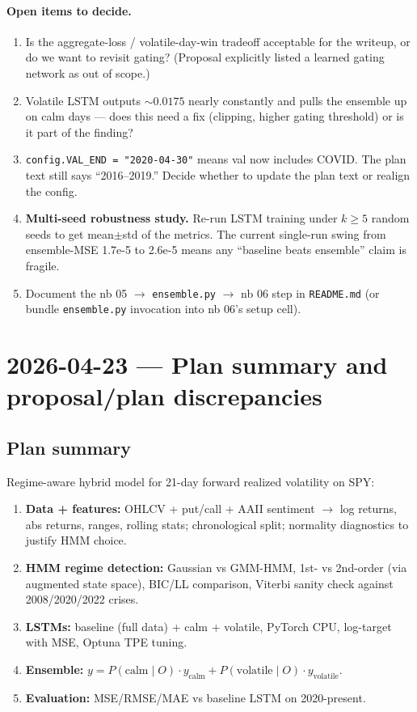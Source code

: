 \documentclass[11pt]{article}
\begin{document}
\paragraph{Open items to decide.}
\begin{enumerate}[leftmargin=*]
  \item Is the aggregate-loss / volatile-day-win tradeoff acceptable for the writeup, or do we want to revisit gating? (Proposal explicitly listed a learned gating network as out of scope.)
  \item Volatile LSTM outputs ${\sim}0.0175$ nearly constantly and pulls the ensemble up on calm days --- does this need a fix (clipping, higher gating threshold) or is it part of the finding?
  \item \texttt{config.VAL\_END = "2020-04-30"} means val now includes COVID. The plan text still says ``2016--2019.'' Decide whether to update the plan text or realign the config.
  \item \textbf{Multi-seed robustness study.} Re-run LSTM training under $k \geq 5$ random seeds to get mean$\pm$std of the metrics. The current single-run swing from ensemble-MSE 1.7e-5 to 2.6e-5 means any ``baseline beats ensemble'' claim is fragile.
  \item Document the nb 05 $\to$ \texttt{ensemble.py} $\to$ nb 06 step in \texttt{README.md} (or bundle \texttt{ensemble.py} invocation into nb 06's setup cell).
\end{enumerate}

\hrulefill

\section*{2026-04-23 --- Plan summary and proposal/plan discrepancies}

\subsection*{Plan summary}

Regime-aware hybrid model for 21-day forward realized volatility on SPY:

\begin{enumerate}[leftmargin=*]
  \item \textbf{Data + features:} OHLCV + put/call + AAII sentiment $\to$ log returns, abs returns, ranges, rolling stats; chronological split; normality diagnostics to justify HMM choice.
  \item \textbf{HMM regime detection:} Gaussian vs GMM-HMM, 1st- vs 2nd-order (via augmented state space), BIC/LL comparison, Viterbi sanity check against 2008/2020/2022 crises.
  \item \textbf{LSTMs:} baseline (full data) + calm + volatile, PyTorch CPU, log-target with MSE, Optuna TPE tuning.
  \item \textbf{Ensemble:} $y = P(\text{calm} \mid O) \cdot y_{\text{calm}} + P(\text{volatile} \mid O) \cdot y_{\text{volatile}}$.
  \item \textbf{Evaluation:} MSE/RMSE/MAE vs baseline LSTM on 2020-present.
\end{enumerate}
\end{document}
